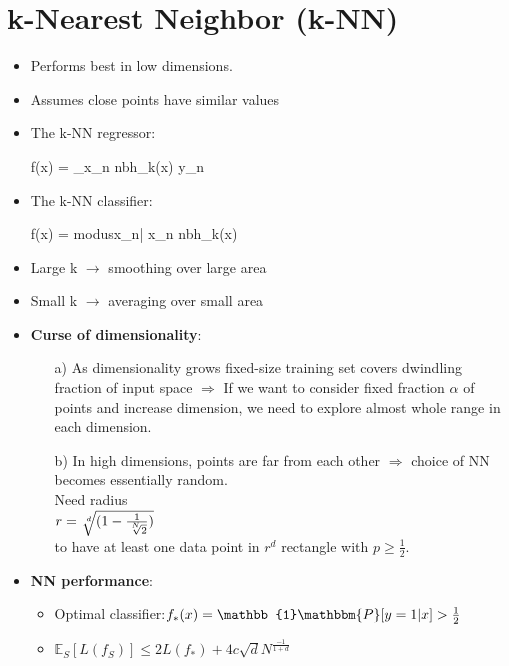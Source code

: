 \section{k-Nearest Neighbor (k-NN)}
\begin{itemize}
	\item Performs best in low dimensions.
	\item Assumes close points have similar values 
	\item The k-NN regressor:
	\begin{myalign*}
	    f(\*x) =  \sum_{\*x_n \in nbh_k(\*x)} \*y_n
	\end{myalign*}
	\item The k-NN classifier:
	\begin{myalign*}
	    f(\*x) = modus{x_n| \*x_n \in nbh_k(\*x)}
	\end{myalign*}
	\item Large k $\rightarrow$ smoothing over large area
	\item Small k $\rightarrow$ averaging over small area
	\item \textbf{Curse of dimensionality}:
	\begin{itemize}
		\item[a)] As dimensionality grows fixed-size training set covers dwindling fraction of input space $\Rightarrow$ If we want to consider fixed fraction $\alpha$ of points and increase dimension, we need to explore almost whole range in each dimension.
		\item[b)] In high dimensions, points are far from each other $\Rightarrow$ choice of NN becomes essentially random. \\
		          Need radius \\
		          $r = \sqrt[\leftroot{-2}\uproot{2}d]{(1-\frac{1}{\sqrt[\leftroot{-2}\uproot{2}N]{2}})}$ \\
		          to have at least one data point in $r^d$ rectangle with $p \geq \frac{1}{2}$.
	\end{itemize}
	\item \textbf{NN performance}:
	\begin{itemize}
		\item Optimal classifier:$ f_*(x) = \mathbb{1}{\mathbbm{P}[y=1|x] > \frac{1}{2}}$
		\item $\mathbb{E}_S[L(f_S)] \leq 2 L(f_*) + 4c\sqrt{d}N^{\frac{-1}{1+d}}$
	\end{itemize}
\end{itemize}



